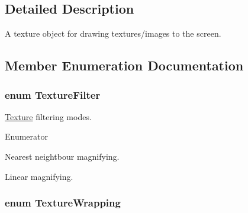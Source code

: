 \subsection{Detailed Description}
A texture object for drawing textures/images to the screen. 

\subsection{Member Enumeration Documentation}
\hypertarget{class_texture_ac4b92e6b8c820ded95490092f8bfff74}{
\subsubsection[{Texture\+Filter}]{\setlength{\rightskip}{0pt plus 5cm}enum {\bf Texture\+Filter}}}\label{class_texture_ac4b92e6b8c820ded95490092f8bfff74}


\hyperlink{class_texture}{Texture} filtering modes. 

\begin{Desc}
\item[Enumerator]\par
\begin{description}
\item[{\em 
\hypertarget{class_texture_ac4b92e6b8c820ded95490092f8bfff74a32bf899c26ebe34101c3c9d15e41b77e}{N\+E\+A\+R\+E\+S\+T}\label{class_texture_ac4b92e6b8c820ded95490092f8bfff74a32bf899c26ebe34101c3c9d15e41b77e}
}]Nearest neightbour magnifying. \item[{\em 
\hypertarget{class_texture_ac4b92e6b8c820ded95490092f8bfff74adc101ebf31c49c2d4b80b7c6f59f22cb}{L\+I\+N\+E\+A\+R}\label{class_texture_ac4b92e6b8c820ded95490092f8bfff74adc101ebf31c49c2d4b80b7c6f59f22cb}
}]Linear magnifying. \end{description}
\end{Desc}
\hypertarget{class_texture_ab57ddfe4ab6794971da5963f80026824}{
\subsubsection[{Texture\+Wrapping}]{\setlength{\rightskip}{0pt plus 5cm}enum {\bf Texture\+Wrapping}}}\label{class_texture_ab57ddfe4ab6794971da5963f80026824}



